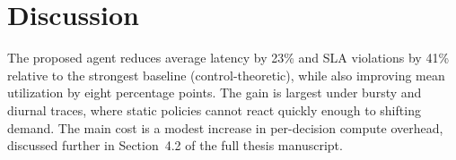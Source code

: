 \section{Discussion}
The proposed agent reduces average latency by 23\% and SLA violations by
41\% relative to the strongest baseline (control-theoretic), while also
improving mean utilization by eight percentage points. The gain is largest
under bursty and diurnal traces, where static policies cannot react quickly
enough to shifting demand. The main cost is a modest increase in
per-decision compute overhead, discussed further in Section~4.2 of the full
thesis manuscript.
